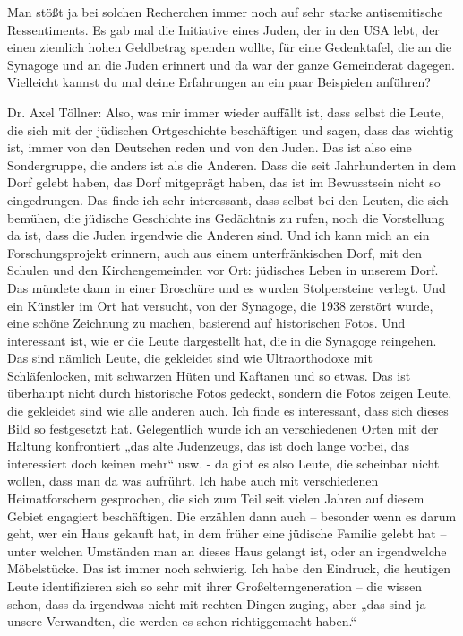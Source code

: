  
Man stößt ja bei solchen Recherchen immer noch auf sehr starke antisemitische Ressentiments.  
Es gab mal die Initiative eines Juden, der in den USA lebt, der einen ziemlich hohen Geldbetrag spenden wollte, für eine Gedenktafel, die an die Synagoge und an die Juden erinnert und da war der ganze Gemeinderat dagegen. Vielleicht kannst du mal deine Erfahrungen an ein paar Beispielen anführen? 

Dr. Axel Töllner: Also, was mir immer wieder auffällt ist, dass selbst die Leute, die sich mit der jüdischen Ortgeschichte beschäftigen und sagen, dass das wichtig ist, immer von den Deutschen reden und von den Juden. Das ist also eine Sondergruppe, die anders ist als die Anderen. Dass die seit Jahrhunderten in dem Dorf gelebt haben, das Dorf mitgeprägt haben, das ist im Bewusstsein nicht so eingedrungen. Das finde ich sehr interessant, dass selbst bei den Leuten, die sich bemühen, die jüdische Geschichte ins Gedächtnis zu rufen, noch die Vorstellung da ist, dass die Juden irgendwie die Anderen sind.  
Und ich kann mich an ein Forschungsprojekt erinnern, auch aus einem unterfränkischen Dorf, mit den Schulen und den Kirchengemeinden vor Ort: jüdisches Leben in unserem Dorf. Das mündete dann in einer Broschüre und es wurden Stolpersteine verlegt. Und ein Künstler im Ort hat versucht, von der Synagoge, die 1938 zerstört wurde, eine schöne Zeichnung zu machen, basierend auf historischen Fotos. Und interessant ist, wie er die Leute dargestellt hat, die in die Synagoge reingehen. Das sind nämlich Leute, die gekleidet sind wie Ultraorthodoxe mit Schläfenlocken, mit schwarzen Hüten und Kaftanen und so etwas. Das ist überhaupt nicht durch historische Fotos gedeckt, sondern die Fotos zeigen Leute, die gekleidet sind wie alle anderen auch. Ich finde es interessant, dass sich dieses Bild so festgesetzt hat. 
Gelegentlich wurde ich an verschiedenen Orten mit der Haltung konfrontiert „das alte Judenzeugs, das ist doch lange vorbei, das interessiert doch keinen mehr“ usw. - da gibt es also Leute, die scheinbar nicht wollen, dass man da was aufrührt. Ich habe auch mit verschiedenen Heimatforschern gesprochen, die sich zum Teil seit vielen Jahren auf diesem Gebiet engagiert beschäftigen. Die erzählen dann auch – besonder wenn es darum geht, wer ein Haus gekauft hat, in dem früher eine jüdische Familie gelebt hat – unter welchen Umständen man an dieses Haus gelangt ist, oder an irgendwelche Möbelstücke. Das ist immer noch schwierig.  
Ich habe den Eindruck, die heutigen Leute identifizieren sich so sehr mit ihrer Großelterngeneration – die wissen schon, dass da irgendwas nicht mit rechten Dingen zuging, aber „das sind ja unsere Verwandten, die werden es schon richtiggemacht haben.“ 

